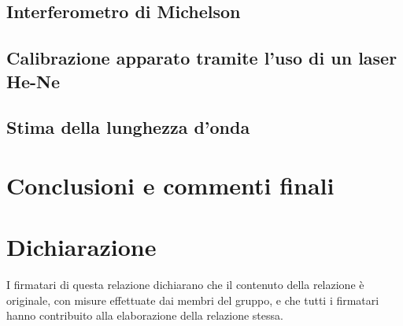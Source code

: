 \documentclass[10pt, a4paper, italian]{article}
\begin{document}
\subsection{Interferometro di Michelson}
\subsection{Calibrazione apparato tramite l'uso di un laser He-Ne}
\subsection{Stima della lunghezza d'onda}

\section*{Conclusioni e commenti finali}

\section*{Dichiarazione}
I firmatari di questa relazione dichiarano che il contenuto della relazione \`e
originale, con misure effettuate dai membri del gruppo, e che tutti i firmatari
hanno contribuito alla elaborazione della relazione stessa.
\end{document}
